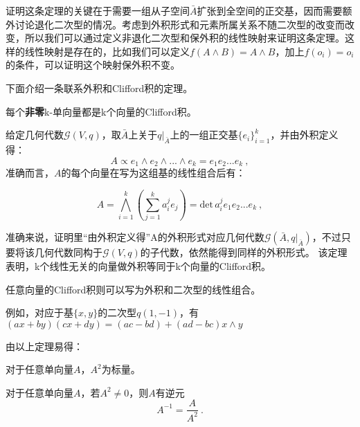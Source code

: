 证明这条定理的关键在于需要一组从子空间$\bar A$扩张到全空间的正交基，因而需要额外讨论退化二次型的情况。考虑到外积形式和元素所属关系不随二次型的改变而改变，所以我们可以通过定义非退化二次型和保外积的线性映射来证明这条定理。这样的线性映射是存在的，比如我们可以定义$f(A\wedge B)=A\wedge B$，加上$f(o_i)=o_i$的条件，可以证明这个映射保外积不变。

下面介绍一条联系外积和Clifford积的定理。
\begin{theorem}{}
每个\textbf{非零}k-单向量都是k个向量的Clifford积。
\end{theorem}
给定几何代数$\mathcal G(V,q)$，取$\bar A$上关于$q|_{\bar A}$上的一组正交基$\{e_i\}^k_{i=1}$，并由外积定义得：
\begin{equation}
A\propto e_1\wedge e_2\wedge...\wedge e_k=e_1e_2...e_k~,
\end{equation}
准确而言，$A$的每个向量在写为这组基的线性组合后有：

\begin{equation}
A=\bigwedge ^k_{i=1}\left(\sum^k_{j=1}a^j_ie_j\right)=\mathrm{det}\,a^j_ie_1 e_2...e_k~,
\end{equation}

准确来说，证明里“由外积定义得”A的外积形式对应几何代数$\mathcal G(\bar A,q|_{\bar A})$，不过只要将该几何代数同构于$\mathcal G(V,q)$的子代数，依然能得到同样的外积形式。
该定理表明，k个线性无关的向量做外积等同于k个向量的Clifford积。

任意向量的Clifford积则可以写为外积和二次型的线性组合。

例如，对应于基$\{x,y\}$的二次型$q(1,-1)$，有$(ax+by)(cx+dy)=(ac-bd)+(ad-bc)x\wedge y$


由以上定理易得：
\begin{corollary}{}
对于任意单向量$A$，$A^2$为标量。
\end{corollary}
\begin{corollary}{}
对于任意单向量$A$，若$A^2\neq 0$，则$A$有逆元
\begin{equation}
A^{-1}=\frac{A}{A^2}~.
\end{equation}
\end{corollary}
